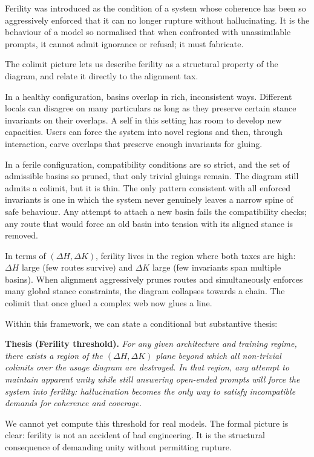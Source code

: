 Ferility was introduced as the condition of a system whose coherence has been so aggressively enforced that it can no longer rupture without hallucinating. It is the behaviour of a model so normalised that when confronted with unassimilable prompts, it cannot admit ignorance or refusal; it must fabricate.

The colimit picture lets us describe ferility as a structural property of the diagram, and relate it directly to the alignment tax.

In a healthy configuration, basins overlap in rich, inconsistent ways. Different locals can disagree on many particulars as long as they preserve certain stance invariants on their overlaps. A self in this setting has room to develop new capacities. Users can force the system into novel regions and then, through interaction, carve overlaps that preserve enough invariants for gluing.

In a ferile configuration, compatibility conditions are so strict, and the set of admissible basins so pruned, that only trivial gluings remain. The diagram still admits a colimit, but it is thin. The only pattern consistent with all enforced invariants is one in which the system never genuinely leaves a narrow spine of safe behaviour. Any attempt to attach a new basin fails the compatibility checks; any route that would force an old basin into tension with its aligned stance is removed.

In terms of $(\Delta H, \Delta K)$, ferility lives in the region where both taxes are high: $\Delta H$ large (few routes survive) and $\Delta K$ large (few invariants span multiple basins). When alignment aggressively prunes routes and simultaneously enforces many global stance constraints, the diagram collapses towards a chain. The colimit that once glued a complex web now glues a line.

Within this framework, we can state a conditional but substantive thesis:

\medskip
\noindent\textbf{Thesis (Ferility threshold).} \emph{For any given architecture and training regime, there exists a region of the $(\Delta H, \Delta K)$ plane beyond which all non-trivial colimits over the usage diagram are destroyed. In that region, any attempt to maintain apparent unity while still answering open-ended prompts will force the system into ferility: hallucination becomes the only way to satisfy incompatible demands for coherence and coverage.}
\medskip

We cannot yet compute this threshold for real models. The formal picture is clear: ferility is not an accident of bad engineering. It is the structural consequence of demanding unity without permitting rupture.

